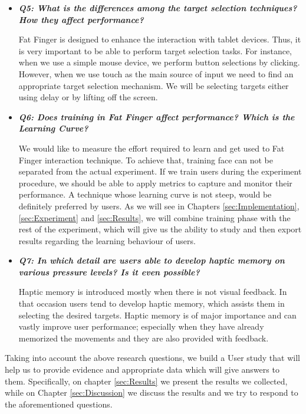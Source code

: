 \begin{itemize}
    \item \emph{\textbf{Q5: What is the differences among the target selection techniques? How they affect performance?}}

    Fat Finger is designed to enhance the interaction with tablet devices. Thus, it is very important to be able to perform target selection tasks. For instance, when we use a simple mouse device, we perform button selections by clicking. However, when we use touch as the main source of input we need to find an appropriate target selection mechanism. We will be selecting targets either using delay or by lifting off the screen.


    \item \emph{\textbf{Q6: Does training in Fat Finger affect performance? Which is the Learning Curve?}}

    We would like to measure the effort required to learn and get used to Fat Finger interaction technique.
    To achieve that, training face can not be separated from the actual experiment. If we train users during the experiment procedure, we should be able to apply metrics to capture and monitor their performance.
    A technique whose learning curve is not steep, would be definitely preferred by users. As we will see in Chapters \ref{sec:Implementation}, \ref{sec:Experiment} and \ref{sec:Results}, we will combine training phase with the rest of the experiment, which will give us the ability to study and then export results regarding the learning behaviour of users.

    \item \emph{\textbf{Q7: In which detail are users able to develop haptic memory on various pressure levels? Is it even possible?}}

    Haptic memory is introduced mostly when there is not visual feedback. In that occasion users tend to develop haptic memory, which assists them in selecting the desired targets. Haptic memory is of major importance and can vastly improve user performance; especially when they have already memorized the movements and they are also provided with feedback.  

\end{itemize}

Taking into account the above research questions, we build a User study that will help us to provide evidence and appropriate data which will give answers to them. Specifically, on chapter \ref{sec:Results} we present the results we collected, while on Chapter \ref{sec:Discussion} we discuss the results and we try to respond to the aforementioned questions.

